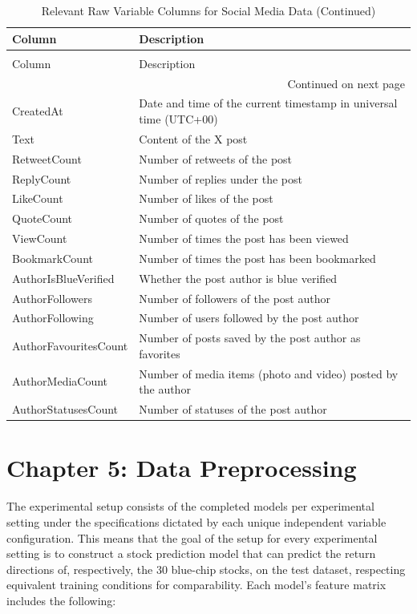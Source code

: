\documentclass[stu,floatsintext]{apa7}
\begin{document}
\begin{longtable}{@{}l p{3.5in}@{}}
\caption{Relevant Raw Variable Columns for Social Media Data}
\label{tab:social_media_data} \\
\toprule
Column & Description \\
\midrule
\endfirsthead
 
\caption[]{Relevant Raw Variable Columns for Social Media Data (Continued)} \\
\toprule
Column & Description \\
\midrule
\endhead

\midrule
\multicolumn{2}{r}{Continued on next page} \\
\endfoot
 
\bottomrule
\endlastfoot

CreatedAt & Date and time of the current timestamp in universal time (UTC+00) \\
Text & Content of the X post \\
RetweetCount & Number of retweets of the post \\
ReplyCount & Number of replies under the post \\
LikeCount & Number of likes of the post \\
QuoteCount & Number of quotes of the post \\
ViewCount & Number of times the post has been viewed \\
BookmarkCount & Number of times the post has been bookmarked \\
AuthorIsBlueVerified &  Whether the post author is blue verified \\
AuthorFollowers & Number of followers of the post author \\
AuthorFollowing & Number of users followed by the post author \\
AuthorFavouritesCount & Number of posts saved by the post author as favorites \\
AuthorMediaCount & Number of media items (photo and video) posted by the author \\
AuthorStatusesCount & Number of statuses of the post author \\
\end{longtable}

\clearpage
\section{Chapter 5: Data Preprocessing}

The experimental setup consists of the completed models per experimental setting under the specifications dictated by each unique independent variable configuration. This means that the goal of the setup for every experimental setting is to construct a stock prediction model that can predict the return directions of, respectively, the 30 blue-chip stocks, on the test dataset, respecting equivalent training conditions for comparability. Each model’s feature matrix includes the following:
\end{document}
